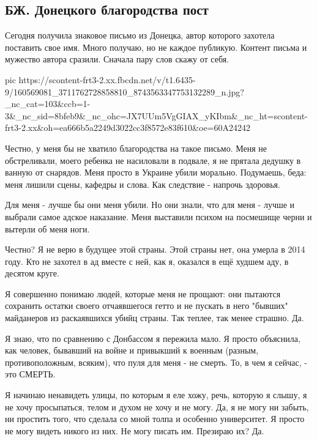  
 
 
 
 
\subsection{БЖ. Донецкого благородства пост}

Сегодня получила знаковое письмо из Донецка, автор которого захотела поставить
свое имя. Много получаю, но не каждое публикую. Контент письма и мужество
автора сразили. Сначала пару слов скажу от себя.


\ifcmt
  pic https://scontent-frt3-2.xx.fbcdn.net/v/t1.6435-9/160569081_3711762728858810_8743563347753132289_n.jpg?_nc_cat=103&ccb=1-3&_nc_sid=8bfeb9&_nc_ohc=JX7UUm5VgGIAX_yKIbm&_nc_ht=scontent-frt3-2.xx&oh=ea666b5a2249d3022cc3f8572e83f610&oe=60A24242
\fi


Честно, у меня бы не хватило благородства на такое письмо. Меня не
обстреливали, моего ребенка не насиловали в подвале, я не прятала дедушку в
ванную от снарядов. Меня просто в Украине убили морально. Подумаешь, беда: меня
лишили сцены, кафедры и слова. Как следствие - напрочь здоровья. 

Для меня - лучше бы они меня убили. Но они знали, что для меня - лучше и
выбрали самое адское наказание. Меня выставили психом на посмешище черни и
вытерли об меня ноги. 

Честно? Я не верю в будущее этой страны. Этой страны нет, она умерла в 2014
году. Кто не захотел в ад вместе с ней, как я, оказался в ещё худшем аду, в
десятом круге. 

Я совершенно понимаю людей, которые меня не прощают: они пытаются сохранить
остатки своего отчаявшегося гетто и не пускать в него "бывших" майданеров из
раскаявшихся убийц страны. Так теплее, так менее страшно. Да.

Я знаю, что по сравнению с Донбассом я пережила мало. Я просто объяснила, как
человек, бывавший на войне и привыкший к военным (разным, противоположным,
всяким), что пуля для меня - не смерть. То, в чем я сейчас, - это СМЕРТЬ. 

Я начинаю ненавидеть улицы, по которым я еле хожу, речь, которую я слышу, я не
хочу просыпаться, телом и духом не хочу и не могу. Да, я не могу ни забыть, ни
простить того, что сделала со мной толпа и особенно университет. Я просто не
могу видеть никого из них. Не могу писать им. Презираю их? Да. 

